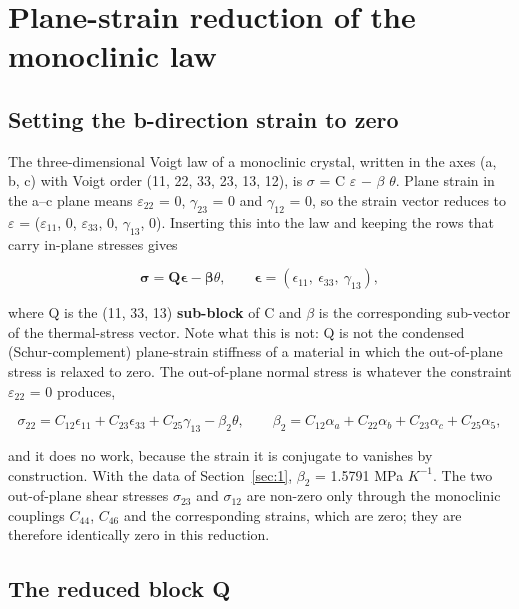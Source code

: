 \documentclass[preprint,12pt]{elsarticle}
\begin{document}
\section{Plane-strain reduction of the monoclinic law}
\label{sec:2}

\subsection{Setting the b-direction strain to zero}
\label{sec:2.1}

The three-dimensional Voigt law of a monoclinic crystal, written in the axes (a, b, c) with Voigt order (11, 22, 33, 23, 13, 12), is $\sigma$ = C $\varepsilon$ $-$ $\beta$ $\theta$. Plane strain in the a--c plane means $\varepsilon_{22}$ = 0, $\gamma_{23}$ = 0 and $\gamma_{12}$ = 0, so the strain vector reduces to $\varepsilon$ = ($\varepsilon_{11}$, 0, $\varepsilon_{33}$, 0, $\gamma_{13}$, 0). Inserting this into the law and keeping the rows that carry in-plane stresses gives

\begin{equation}
\boldsymbol{\sigma}=\mathbf{Q}\boldsymbol{\epsilon}-\boldsymbol{\beta}\theta,\qquad\boldsymbol{\epsilon}=(\epsilon_{11},\ \epsilon_{33},\ \gamma_{13}), 
\label{eq:2}
\end{equation}

where Q is the (11, 33, 13) \textbf{sub-block} of C and $\beta$ is the corresponding sub-vector of the thermal-stress vector. Note what this is not: Q is not the condensed (Schur-complement) plane-strain stiffness of a material in which the out-of-plane stress is relaxed to zero. The out-of-plane normal stress is whatever the constraint $\varepsilon_{22}$ = 0 produces,

\begin{equation}
\sigma_{22}=C_{12}\epsilon_{11}+C_{23}\epsilon_{33}+C_{25}\gamma_{13}-\beta_2\theta,\qquad \beta_2=C_{12}\alpha_a+C_{22}\alpha_b+C_{23}\alpha_c+C_{25}\alpha_5, 
\label{eq:3}
\end{equation}

and it does no work, because the strain it is conjugate to vanishes by construction. With the data of Section~\ref{sec:1}, $\beta_{2}$ = 1.5791 MPa $K^{-1}$. The two out-of-plane shear stresses $\sigma_{23}$ and $\sigma_{12}$ are non-zero only through the monoclinic couplings $C_{44}$, $C_{46}$ and the corresponding strains, which are zero; they are therefore identically zero in this reduction.

\subsection{The reduced block Q}
\label{sec:2.2}
\end{document}
